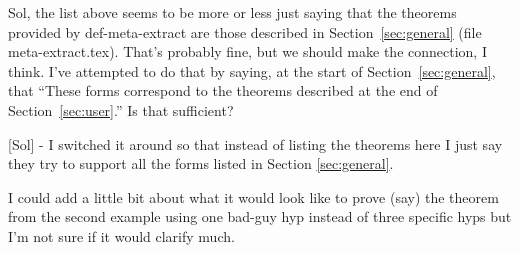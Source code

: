 \begin{mycomment}
Sol, the list above seems to be more or less just
  saying that the theorems provided by def-meta-extract are those
  described in Section~\ref{sec:general} (file meta-extract.tex).
  That's probably fine, but we should make the connection, I think.
  I've attempted to do that by saying, at the start of
  Section~\ref{sec:general}, that ``These forms correspond to the
  theorems described at the end of Section~\ref{sec:user}.''  Is that
  sufficient?

  [Sol] - I switched it around so that instead of listing the theorems
  here I just say they try to support all the forms listed in Section
  \ref{sec:general}.

  I could add a little bit about what it would look like to prove
  (say) the theorem from the second example using one bad-guy hyp
  instead of three specific hyps but I'm not sure if it would clarify
  much.
\end{mycomment}
